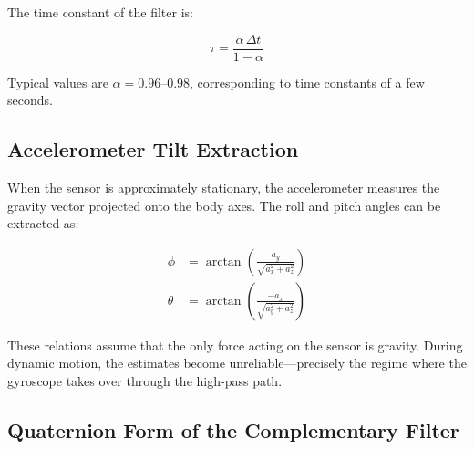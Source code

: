 The time constant of the filter is:

\begin{equation}
  \tau = \frac{\alpha\,\Delta t}{1 - \alpha}
  \label{eq:time_constant}
\end{equation}

\noindent Typical values are $\alpha = 0.96$--$0.98$, corresponding to time
constants of a few seconds.

%

\subsection{Accelerometer Tilt Extraction}
\label{sec:cf:tilt}

When the sensor is approximately stationary, the accelerometer measures the
gravity vector projected onto the body axes. The roll and pitch angles can be
extracted as:

\begin{align}
  \phi   &= \arctan\!\left(\frac{a_y}{\sqrt{a_x^2 + a_z^2}}\right)
  \label{eq:roll} \\[4pt]
  \theta &= \arctan\!\left(\frac{-a_x}{\sqrt{a_y^2 + a_z^2}}\right)
  \label{eq:pitch}
\end{align}

\noindent These relations assume that the only force acting on the sensor is
gravity. During dynamic motion, the estimates become unreliable---precisely the
regime where the gyroscope takes over through the high-pass path.

\subsection{Quaternion Form of the Complementary Filter}
\label{sec:cf:quaternion}

